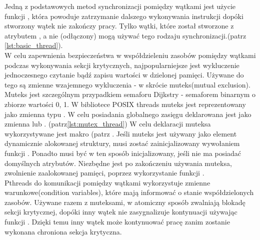 \documentclass[document.tex]{subfiles}
\begin{document}
Jedną z podstawowych metod synchronizacji pomiędzy wątkami jest użycie funkcji , która powoduje zatrzymanie dalszego wykonywania instrukcji dopóki stworzony wątek nie zakończy pracy.
Tylko wątki, które został stworzone z atrybutem , 
a nie (odłączony) mogą używać tego rodzaju synchronizacji.\cite{POSIX_article}(patrz \ref{lst:basic_thread}). %
\\
 

\indent W celu zapewnienia bezpieczeństwa w współdzieleniu zasobów
pomiędzy wątkami podczas wykonywania sekcji krytycznych,
najpopularniejsze jest wykluczenie jednoczesnego czytanie bądź zapisu
wartości w dzielonej pamięci. Używane do tego są zmienne wzajemnego
wykluczenia - w skrócie muteks(mutual exclusion). Muteks jest szczególnym przypadkiem semaforu Dijkstry - semaforem binarnym 
o zbiorze wartości {0, 1}.\cite{POSIX_Butenhof}\cite{POSIX_tutorial}\cite{POSIX_article} 
W bibliotece POSIX threads muteks jest reprezentowany jako zmienna typu . W celu posiadania globalnego
zasięgu deklarowana jest jako zmienna  lub .
\cite{POSIX_Butenhof}\cite{C_King}(patrz\ref{lst:mutex_thread})
W celu deklaracji muteksa wykorzystywane jest makro (patrz . Jeśli muteks jest używany jako
element dynamicznie alokowanej struktury, musi zostać zainicjalizowany 
wywołaniem funkcji . Ponadto musi być w ten
sposób inicjalizowany, jeśli nie ma posiadać domyślnych atrybutów.
Niezbędne jest po zakończeniu używania muteksa, zwolnienie zaalokowanej pamięci, poprzez wykorzystanie funkcji .\cite{POSIX_Butenhof} 
\\


\indent Pthreads do komunikacji pomiędzy wątkami wykorzystuje zmienne
warunkowe(condition variables), które mają informować o stanie 
współdzielonych zasobów. Używane razem z muteksami, w atomiczny 
sposób zwalniają blokadę sekcji krytycznej, dopóki inny wątek nie
zasygnalizuje kontynuacji używając funkcji . Dzięki temu inny wątek może kontynuować pracę 
zanim zostanie wykonana chroniona sekcja krytyczna.
\end{document}
